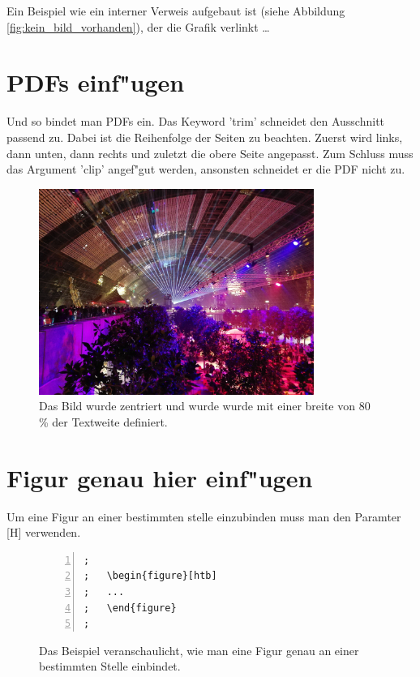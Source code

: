 Ein Beispiel wie ein interner Verweis aufgebaut ist (siehe Abbildung \ref{fig:kein_bild_vorhanden}), der die Grafik verlinkt \dots

\section{PDFs einf"ugen}
\label{sec:PDFeinfuegen}
Und so bindet man PDFs ein. Das Keyword 'trim' schneidet den Ausschnitt passend zu. Dabei ist die Reihenfolge der Seiten zu beachten. Zuerst wird links, dann unten, dann rechts und zuletzt die obere Seite angepasst. Zum Schluss muss das Argument 'clip' angef"gut werden, ansonsten schneidet er die PDF nicht zu.

\begin{figure}[htb]
  \centering  
  \includegraphics[width=0.8\textwidth, trim = 10mm 10mm 10mm 10mm, clip]{img/34c3.pdf}
  \caption{Das Bild wurde zentriert und wurde wurde mit einer breite von 80 \% der Textweite definiert.} 
  \label{fig:Teambild}
\end{figure}
\FloatBarrier


\section{Figur genau hier einf"ugen}
\label{sec:FigurHierEinfuegen}
Um eine Figur an einer bestimmten stelle einzubinden muss man den Paramter [H] verwenden.

\FloatBarrier
\begin{figure}[htb]
\begin{lstlisting}[backgroundcolor={\color{white}},
basicstyle={\normalsize\sffamily},
breaklines=true,
frame={bottomline,topline, rightline},
language=HTML,
numbers=left,
showstringspaces=false,
xleftmargin=22pt]	
; 
;	\begin{figure}[htb]
;	...
;	\end{figure}
;
\end{lstlisting}
  \caption[Die Anweisung, wie man eine Figure genau hier einbindet.]{Das Beispiel veranschaulicht, wie man eine Figur genau an einer bestimmten Stelle einbindet.}
\label{lst:FigurGenauHier}
\end{figure}


